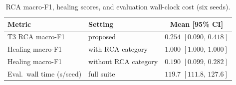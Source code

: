 \begin{table}[!t]
\centering
\caption{RCA macro-F1, healing scores, and evaluation wall-clock cost (six seeds).}
\label{tab:rcaheal}
\renewcommand{\arraystretch}{1.1}
{\footnotesize\begin{tabular*}{\columnwidth}{@{\extracolsep{\fill}}llc}
\toprule
Metric & Setting & Mean [95\% CI] \\
\midrule
T3 RCA macro-F1 & proposed & $0.254$ $[0.090,\,0.418]$ \\
Healing macro-F1 & with RCA category & $1.000$ $[1.000,\,1.000]$ \\
Healing macro-F1 & without RCA category & $0.190$ $[0.099,\,0.282]$ \\
Eval.\ wall time (s/seed) & full suite & $119.7$ $[111.8,\,127.6]$ \\
\bottomrule
\end{tabular*}}
\end{table}

